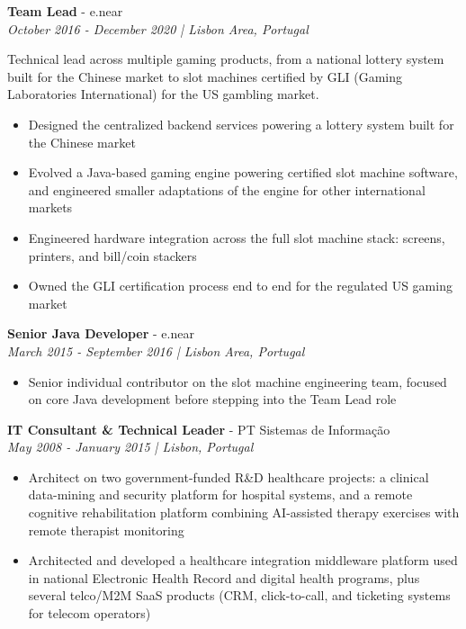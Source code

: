 \documentclass[11pt,a4paper]{article}
\newcommand{\cventry}[4]{%
  \textbf{#1} - #2\\
  {\small\color{subtext}\textit{#3 | #4}}\par\vspace{3pt}
}
\newcommand{\cvintro}[1]{#1\par\vspace{3pt}}
\newenvironment{cvitems}{\begin{itemize}[leftmargin=1.3em,itemsep=3pt,topsep=4pt,parsep=0pt]}{\end{itemize}}
\begin{document}
\vspace{5pt}
\cventry{Team Lead}{e.near}{October 2016 - December 2020}{Lisbon Area, Portugal}
\cvintro{Technical lead across multiple gaming products, from a national lottery system built for the Chinese market to slot machines certified by GLI (Gaming Laboratories International) for the US gambling market.}
\begin{cvitems}
  \item Designed the centralized backend services powering a lottery system built for the Chinese market
  \item Evolved a Java-based gaming engine powering certified slot machine software, and engineered smaller adaptations of the engine for other international markets
  \item Engineered hardware integration across the full slot machine stack: screens, printers, and bill/coin stackers
  \item Owned the GLI certification process end to end for the regulated US gaming market
\end{cvitems}

\vspace{5pt}
\cventry{Senior Java Developer}{e.near}{March 2015 - September 2016}{Lisbon Area, Portugal}
\begin{cvitems}
  \item Senior individual contributor on the slot machine engineering team, focused on core Java development before stepping into the Team Lead role
\end{cvitems}

\vspace{5pt}
\cventry{IT Consultant \& Technical Leader}{PT Sistemas de Informação}{May 2008 - January 2015}{Lisbon, Portugal}
\begin{cvitems}
  \item Architect on two government-funded R\&D healthcare projects: a clinical data-mining and security platform for hospital systems, and a remote cognitive rehabilitation platform combining AI-assisted therapy exercises with remote therapist monitoring
  \item Architected and developed a healthcare integration middleware platform used in national Electronic Health Record and digital health programs, plus several telco/M2M SaaS products (CRM, click-to-call, and ticketing systems for telecom operators)
\end{cvitems}

\end{document}
